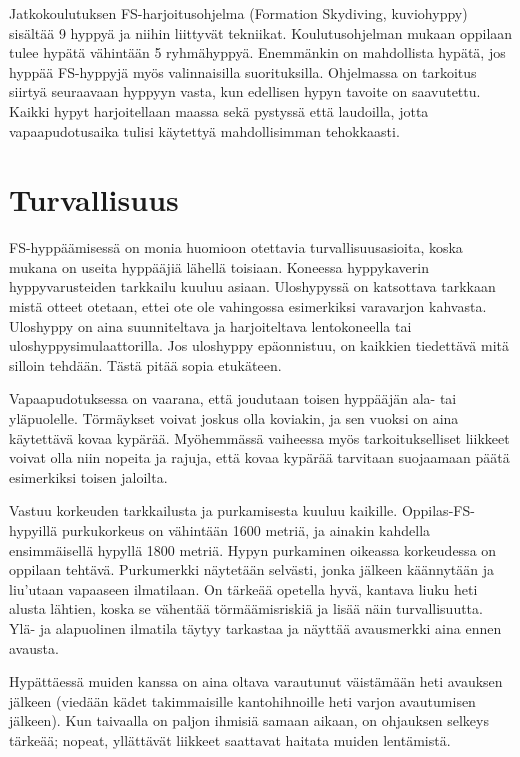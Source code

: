 
Jatkokoulutuksen FS-harjoitusohjelma (Formation Skydiving, kuviohyppy) sisältää 9 hyppyä ja niihin liittyvät tekniikat. Koulutusohjelman mukaan oppilaan tulee hypätä vähintään 5 ryhmähyppyä. Enemmänkin on mahdollista hypätä, jos hyppää FS-hyppyjä myös valinnaisilla suorituksilla. Ohjelmassa on tarkoitus siirtyä seuraavaan hyppyyn vasta, kun edellisen hypyn tavoite on saavutettu. Kaikki hypyt harjoitellaan maassa sekä pystyssä että laudoilla, jotta vapaapudotusaika tulisi käytettyä mahdollisimman tehokkaasti. 

\section{ Turvallisuus }
\label{fs-kuviohyppaaminen-turvallisuus}


FS-hyppäämisessä on monia huomioon otettavia turvallisuusasioita, koska mukana on useita hyppääjiä lähellä toisiaan. Koneessa hyppykaverin hyppyvarusteiden tarkkailu kuuluu asiaan. Uloshypyssä on katsottava tarkkaan mistä otteet otetaan, ettei ote ole vahingossa esimerkiksi varavarjon kahvasta. Uloshyppy on aina suunniteltava ja harjoiteltava lentokoneella tai uloshyppysimulaattorilla. Jos uloshyppy epäonnistuu, on kaikkien tiedettävä mitä silloin tehdään. Tästä pitää sopia etukäteen.  


Vapaapudotuksessa on vaarana, että joudutaan toisen hyppääjän ala- tai yläpuolelle. Törmäykset voivat joskus olla koviakin, ja sen vuoksi on aina käytettävä kovaa kypärää. Myöhemmässä vaiheessa myös tarkoitukselliset liikkeet voivat olla niin nopeita ja rajuja, että kovaa kypärää tarvitaan suojaamaan päätä esimerkiksi toisen jaloilta.  


Vastuu korkeuden tarkkailusta ja purkamisesta kuuluu kaikille. Oppilas-FS-hypyillä purkukorkeus on vähintään 1600 metriä, ja ainakin kahdella ensimmäisellä hypyllä 1800 metriä. Hypyn purkaminen oikeassa korkeudessa on oppilaan tehtävä. Purkumerkki näytetään selvästi, jonka jälkeen käännytään ja liu’utaan vapaaseen ilmatilaan. On tärkeää opetella hyvä, kantava liuku heti alusta lähtien, koska se vähentää törmäämisriskiä ja lisää näin turvallisuutta. Ylä- ja alapuolinen ilmatila täytyy tarkastaa ja näyttää avausmerkki aina ennen avausta. 


Hypättäessä muiden kanssa on aina oltava varautunut väistämään heti avauksen jälkeen (viedään kädet takimmaisille kantohihnoille heti varjon avautumisen jälkeen). Kun taivaalla on paljon ihmisiä samaan aikaan, on ohjauksen selkeys tärkeää; nopeat, yllättävät liikkeet saattavat haitata muiden lentämistä. 

